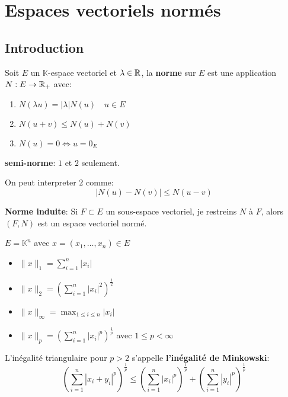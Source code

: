 \chapter{Espaces vectoriels normés}
\section{Introduction}
\begin{definition}
    Soit $E$ un  $\mathbb{K}$-espace vectoriel et $\lambda \in \mathbb{R}$, la \textbf{norme} sur  $E$ est une application $N: E \to \mathbb{R}_{+}$ avec:
    \begin{enumerate}
        \item $N(\lambda u) = |\lambda|N(u) \quad u \in E$
        \item $N(u + v) \le N(u) + N(v)$
        \item $N(u) = 0 \iff u = 0_{E}$
    \end{enumerate}
    \textbf{semi-norme}: $1$ et  $2$ seulement.
\end{definition}

On peut interpreter $2$ comme:
 \[
\left| N(u) - N(v) \right| \le N(u - v)
\] 

\begin{prop}
    \textbf{Norme induite}: Si $F \subset E$ un sous-espace vectoriel, je restreins $N$ à  $F$, alors  $(F, N)$ est un espace vectoriel normé.
\end{prop}

\begin{eg}
    $E = \mathbb{K}^n$ avec  $x = (x_1, \ldots, x_n) \in E$ 
    \begin{itemize}
        \item $\|x\|_1 = \sum_{i=1}^{n} |x_i|$
        \item $\|x\|_2 = \left(\sum_{i=1}^{n} |x_i|^2\right)^{\frac{1}{2}}$
        \item $\|x\|_{\infty} = \max_{1 \le i \le n} |x_i|$
        \item $\|x\|_p = \left( \sum_{i=1}^{n} |x_i|^p \right)^{\frac{1}{p}}$ avec $1 \le p < \infty$
    \end{itemize}
\end{eg}

\begin{prop}
    L'inégalité triangulaire pour $p > 2$ s'appelle \textbf{l'inégalité de Minkowski}:
    \[
        \left( \sum_{i=1}^{n} |x_i + y_i|^p \right)^{\frac{1}{p}} \le  \left( \sum_{i=1}^{n} |x_i |^p \right)^{\frac{1}{p}} + \left( \sum_{i=1}^{n} |y_i|^p \right)^{\frac{1}{p}}
    \] 
\end{prop}

